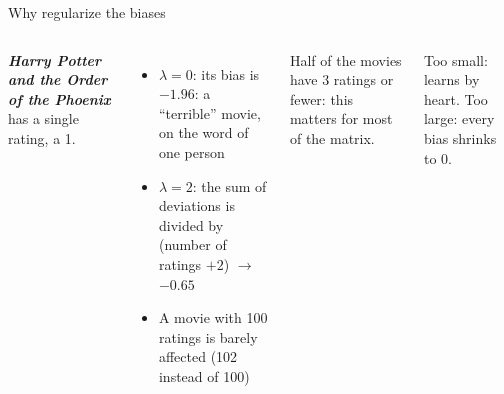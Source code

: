 \documentclass[aspectratio=169,11pt]{beamer}
\newcommand{\key}[1]{\textcolor{accent}{\textbf{#1}}}
\newcommand{\muted}[1]{\textcolor{soft}{#1}}
\begin{document}
\begin{frame}{Why regularize the biases}
\begin{columns}[c]
\textbf{\emph{Harry Potter and the Order of the Phoenix}} has a single rating, a 1.
\begin{itemize}
  \item $\lambda = 0$: its bias is $-1.96$: a ``terrible'' movie, on the word of one person
  \item $\lambda = 2$: the sum of deviations is divided by (number of ratings $+ 2$) $\to$ \key{$-0.65$}
  \item A movie with 100 ratings is barely affected (102 instead of 100)
\end{itemize}
\vspace{0.3em}
Half of the movies have 3 ratings or fewer: this matters for most of the matrix.

\muted{\footnotesize Too small: learns by heart. Too large: every bias shrinks to 0.}
\end{columns}
\end{frame}
\end{document}
